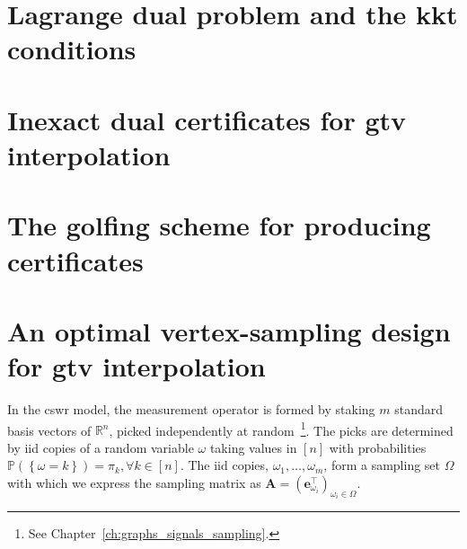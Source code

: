 \section{Lagrange dual problem and the \texorpdfstring{\acrshort{kkt}}{KKT} conditions}



\section{Inexact dual certificates for \texorpdfstring{\acrshort{gtv}}{G-TV} interpolation}\label{sec:inexact_dc}



\section{The golfing scheme for producing certificates}



\section{An optimal vertex-sampling design for \texorpdfstring{\acrshort{gtv}}{G-TV} interpolation}

In the \acrshort{cswr} model, the measurement operator is formed by staking $m$ standard basis vectors of $\mathbb{R}^{n}$, picked independently at random~\footnote{See Chapter~\ref{ch:graphs_signals_sampling}.}. The picks are determined by \acrshort{iid} copies of a random variable $\omega$ taking values in $[n]$ with probabilities $\mathbb{P} \left ( \left \{  \omega = k \right \}\right ) = \pi_k, \forall k \in [n]$. The \acrshort{iid} copies, $\omega_1, \dots, \omega_m$, form a sampling set $\Omega$ with which we express the sampling matrix as $\mathbf{A} = \left(\mathbf{e}_{\omega_i}^\top\right)_{\omega_i \in \Omega}$.

